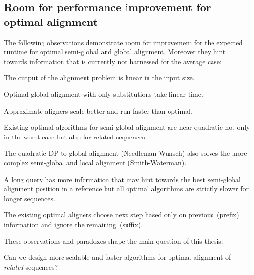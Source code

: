 \subsection*{Room for performance improvement for optimal alignment}

The following observations demonstrate room for improvement for the expected
runtime for optimal semi-global and global alignment. Moreover they hint towards
information that is currently not harnessed for the average case:

\begin{observation}
    The output of the alignment problem is linear in the input size.
\end{observation}

\begin{observation}
    Optimal global alignment with only substitutions take linear time.
\end{observation}

\begin{observation}
    Approximate aligners scale better and run faster than optimal.
\end{observation}

\begin{observation}
    Existing optimal algorithms for semi-global alignment are near-quadratic not
    only in the worst case but also for related sequences.
\end{observation}

\begin{observation}
    The quadratic DP to global alignment (Needleman-Wunsch) also solves the more
    complex semi-global and local alignment (Smith-Waterman).
\end{observation}

\begin{paradox}
    A long query has more information that may hint towards the best semi-global
    alignment position in a reference but all optimal algorithms are strictly
    slower for longer sequences.
\end{paradox}

\begin{observation}
    The existing optimal aligners choose next step based only on
    previous~(prefix) information and ignore the remaining~(suffix).
\end{observation}

These observations and paradoxes shape the main question of this thesis:

\begin{problem}
    Can we design more scalable and faster algorithms for optimal alignment of
    \emph{related} sequences?
\end{problem}

